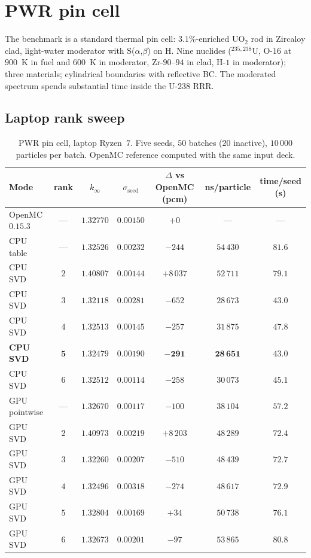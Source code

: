 \documentclass[11pt,a4paper]{article}
\begin{document}
\section{PWR pin cell}
\label{sec:pwr}

The benchmark is a standard thermal pin cell: $3.1\%$-enriched
UO$_2$ rod in Zircaloy clad, light-water moderator with
S($\alpha$,$\beta$) on H. Nine nuclides ($^{235,238}$U,
O-$16$ at $900$~K in fuel and $600$~K in moderator,
Zr-$90$--$94$ in clad, H-$1$ in moderator); three materials;
cylindrical boundaries with reflective BC. The moderated
spectrum spends substantial time inside the U-$238$ RRR.

\subsection{Laptop rank sweep}

\begin{table}[htb]
\centering
\caption{PWR pin cell, laptop Ryzen~$7$. Five seeds, $50$
batches ($20$ inactive), $10\,000$ particles per batch. OpenMC
reference computed with the same input deck.}
\label{tab:keff_pwr}
\begin{tabular}{@{}lcccccc@{}}
\toprule
Mode & rank & $k_\infty$ & $\sigma_\text{seed}$ &
$\Delta$ vs OpenMC (pcm) & ns/particle & time/seed (s) \\
\midrule
OpenMC $0.15.3$    & ---  & $1.32770$ & $0.00150$ & $+0$      & ---       & ---  \\
CPU table          & ---  & $1.32526$ & $0.00232$ & $-244$    & $54\,430$ & $81.6$ \\
CPU SVD            & $2$  & $1.40807$ & $0.00144$ & $+8\,037$ & $52\,711$ & $79.1$ \\
CPU SVD            & $3$  & $1.32118$ & $0.00281$ & $-652$    & $28\,673$ & $43.0$ \\
CPU SVD            & $4$  & $1.32513$ & $0.00145$ & $-257$    & $31\,875$ & $47.8$ \\
\textbf{CPU SVD}   & $\mathbf{5}$ & $\mathbf{1.32479}$ &
 $\mathbf{0.00190}$ & $\mathbf{-291}$ & $\mathbf{28\,651}$ & $\mathbf{43.0}$ \\
CPU SVD            & $6$  & $1.32512$ & $0.00114$ & $-258$    & $30\,073$ & $45.1$ \\
GPU pointwise      & ---  & $1.32670$ & $0.00117$ & $-100$    & $38\,104$ & $57.2$ \\
GPU SVD            & $2$  & $1.40973$ & $0.00219$ & $+8\,203$ & $48\,289$ & $72.4$ \\
GPU SVD            & $3$  & $1.32260$ & $0.00207$ & $-510$    & $48\,439$ & $72.7$ \\
GPU SVD            & $4$  & $1.32496$ & $0.00318$ & $-274$    & $48\,617$ & $72.9$ \\
GPU SVD            & $5$  & $1.32804$ & $0.00169$ & $+34$     & $50\,738$ & $76.1$ \\
GPU SVD            & $6$  & $1.32673$ & $0.00201$ & $-97$     & $53\,865$ & $80.8$ \\
\bottomrule
\end{tabular}
\end{table}
\end{document}
